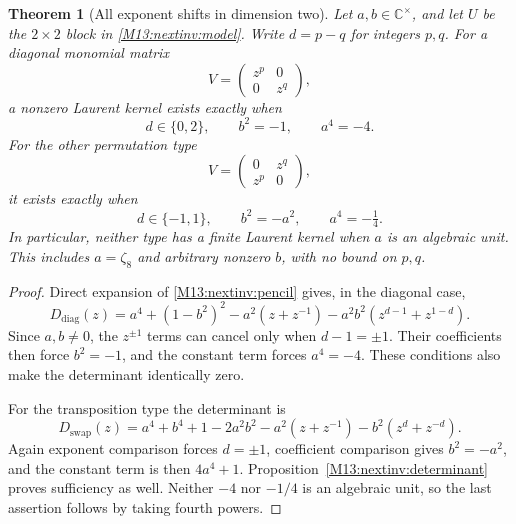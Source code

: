 \documentclass[11pt,a4paper,oneside]{report}
\newtheorem{theorem}{Theorem}[section]
\theoremstyle{definition}
\theoremstyle{remark}
\newcommand{\C}{\mathbb C}
\begin{document}
\begin{theorem}[All exponent shifts in dimension two]
\label{M13:nextinv:two-dimensional}
Let $a,b\in\C^\times$, and let $U$ be the $2\times2$ block in
\eqref{M13:nextinv:model}. Write $d=p-q$ for integers $p,q$.
For a diagonal monomial matrix
\[
 V=\begin{pmatrix}z^p&0\\0&z^q\end{pmatrix},
\]
a nonzero Laurent kernel exists exactly when
\[
 d\in\{0,2\},\qquad b^2=-1,\qquad a^4=-4.
\]
For the other permutation type
\[
 V=\begin{pmatrix}0&z^q\\z^p&0\end{pmatrix},
\]
it exists exactly when
\[
 d\in\{-1,1\},\qquad b^2=-a^2,\qquad a^4=-\tfrac14.
\]
In particular, neither type has a finite Laurent kernel when $a$
is an algebraic unit. This includes $a=\zeta_8$ and arbitrary
nonzero $b$, with no bound on $p,q$.
\end{theorem}
\begin{proof}
Direct expansion of \eqref{M13:nextinv:pencil} gives, in the diagonal case,
\[
 D_\mathrm{diag}(z)=a^4+(1-b^2)^2-a^2(z+z^{-1})
                  -a^2b^2(z^{d-1}+z^{1-d}).
\]
Since $a,b\ne0$, the $z^{\pm1}$ terms can cancel only when
$d-1=\pm1$. Their coefficients then force $b^2=-1$, and the
constant term forces $a^4=-4$. These conditions also make the
determinant identically zero.

For the transposition type the determinant is
\[
 D_\mathrm{swap}(z)=a^4+b^4+1-2a^2b^2
                   -a^2(z+z^{-1})-b^2(z^d+z^{-d}).
\]
Again exponent comparison forces $d=\pm1$, coefficient comparison
gives $b^2=-a^2$, and the constant term is then $4a^4+1$.
Proposition~\ref{M13:nextinv:determinant} proves sufficiency as well.
Neither $-4$ nor $-1/4$ is an algebraic unit, so the last assertion
follows by taking fourth powers.
\end{proof}
\end{document}
